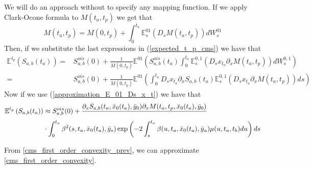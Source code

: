 \documentclass[a4paper,10pt]{article}
\newcommand{\1}{\mathbf{1}}
\begin{document}
We will do an approach without to specify any mapping function. If we apply Clark-Ocone formula to $M(t_a,t_p)$ we get that
\begin{equation} \label{clark_ocone_swap_m}
M(t_a,t_p) = M(0,t_p)+ \int_{0}^{t_a} \mathbb{E}_s^{01}\left(D_s M(t_a,t_p)\right) dW^{01}_s
\end{equation}
Then, if we substitute the last expressions in (\ref{expected_t_p_cms}) we have that
\begin{align}\label{cms_first_order_convexity_prev}
\mathbb{E}^{t_p}\left(S_{a,b}(t_a)\right) =& S^{ois}_{a,b}(0) + \frac{1}{M(0,t_p)} \mathbb{E}^{01}\left( S^{ois}_{a,b}(t_a) \int_{0}^{t_a} \mathbb{E}^{0,1}_s\left(D_s x_{t_a}\partial_x M(t_a,t_p)  \right) dW^{0,1}_s   \right) \nonumber \\
=&  S^{ois}_{a,b}(0) + \frac{1}{M(0,t_p)} \mathbb{E}^{01}\left(\int_{0}^{t_a} D_s x_{t_a} \partial_x S_{a,b}(t_a) \mathbb{E}^{0,1}_s\left(D_s x_{t_a}\partial_x M(t_a,t_p)  \right) ds   \right)
\end{align}
Now if we use (\ref{approximation_E_01_Ds_x_t}) we have that
\begin{align}
\mathbb{E}^{t_p}\left(S_{a,b}(t_a)\right) &\approx  S^{ois}_{a,b}(0) + \frac{\partial_x S_{a,b}(t_a,\bar{x}_0(t_a), \bar{y}_0) \partial_x M(t_a,t_p,\bar{x}_0(t_a), \bar{y}_0)} \nonumber \\
&\cdot \int_{0}^{t_a}  \beta^2(s,t_a,\bar{x}_0(t_a),\bar{y}_s) \exp\left(-2\int_{s}^{t_a}\beta(u,t_a,\bar{x}_{0}(t_a),\bar{y}_u) \mu(u,t_a,t_b) du \right)ds 
\end{align}


From \eqref{cms_first_order_convexity_prev}, we can approximate \eqref{cms_first_order_convexity}.


%
\end{document}
